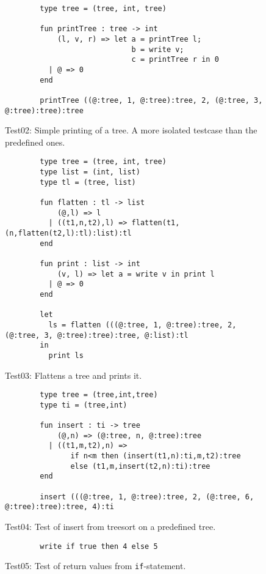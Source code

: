 \begin{figure}
    \centering
    \begin{lstlisting}
        type tree = (tree, int, tree)

        fun printTree : tree -> int
            (l, v, r) => let a = printTree l;
                             b = write v;
                             c = printTree r in 0
          | @ => 0
        end

        printTree ((@:tree, 1, @:tree):tree, 2, (@:tree, 3, @:tree):tree):tree
    \end{lstlisting}
    \label{fig:tests:test02}
    \caption{Test02: Simple printing of a tree. A more isolated testcase than
             the predefined ones.}
\end{figure}

\begin{figure}
    \centering
    \begin{lstlisting}
        type tree = (tree, int, tree)
        type list = (int, list)
        type tl = (tree, list)

        fun flatten : tl -> list
            (@,l) => l
          | ((t1,n,t2),l) => flatten(t1,(n,flatten(t2,l):tl):list):tl
        end

        fun print : list -> int
            (v, l) => let a = write v in print l
          | @ => 0
        end

        let
          ls = flatten (((@:tree, 1, @:tree):tree, 2, (@:tree, 3, @:tree):tree):tree, @:list):tl
        in
          print ls
    \end{lstlisting}
    \label{fig:tests:test03}
    \caption{Test03: Flattens a tree and prints it.}
\end{figure}

\begin{figure}
    \centering
    \begin{lstlisting}
        type tree = (tree,int,tree)
        type ti = (tree,int)

        fun insert : ti -> tree
            (@,n) => (@:tree, n, @:tree):tree
          | ((t1,m,t2),n) =>
               if n<m then (insert(t1,n):ti,m,t2):tree
               else (t1,m,insert(t2,n):ti):tree
        end

        insert (((@:tree, 1, @:tree):tree, 2, (@:tree, 6, @:tree):tree):tree, 4):ti
    \end{lstlisting}
    \label{fig:tests:test04}
    \caption{Test04: Test of insert from treesort on a predefined tree.}
\end{figure}

\begin{figure}
    \centering
    \begin{lstlisting}
        write if true then 4 else 5
    \end{lstlisting}
    \label{fig:tests:test05}
    \caption{Test05: Test of return values from \texttt{if}-statement.}
\end{figure}
